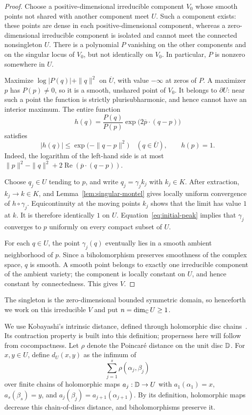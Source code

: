 \begin{proof}
Choose a positive-dimensional irreducible component $V_0$ whose smooth
points not shared with another component meet $U$.  Such a component exists:
these points are dense in each positive-dimensional component, whereas a
zero-dimensional irreducible component is isolated and cannot meet the
connected nonsingleton $U$.  There is a polynomial $P$ vanishing on the
other components and on the singular locus of $V_0$, but not identically on
$V_0$.  In particular, $P$ is nonzero somewhere in $U$.

Maximize $\log|P(q)|+\|q\|^2$ on $\overline U$, with value $-\infty$ at
zeros of $P$.  A maximizer $p$ has $P(p)\ne0$, so it is a smooth, unshared
point of $V_0$.  It belongs to $\partial U$: near such a point the function
is strictly plurisubharmonic, and hence cannot have an interior maximum.
The entire function
\[
  h(q)=\frac{P(q)}{P(p)}
          \exp\bigl(2\overline p\cdot(q-p)\bigr)
\]
satisfies
\begin{equation}\label{eq:initial-peak}
  |h(q)|\leq \exp\bigl(-\|q-p\|^2\bigr)
  \quad(q\in\overline U),\qquad h(p)=1.
\end{equation}
Indeed, the logarithm of the left-hand side is at most
$\|p\|^2-\|q\|^2+2\operatorname{Re}(\overline p\cdot(q-p))$.

Choose $q_j\in U$ tending to $p$, and write $q_j=\gamma_j k_j$ with
$k_j\in K$.  After extraction, $k_j\to k\in K$, and
Lemma~\ref{lem:singular-montel} gives locally uniform convergence of
$h\circ\gamma_j$.  Equicontinuity at the moving points $k_j$ shows that
the limit has value $1$ at $k$.  It is therefore identically $1$ on $U$.
Equation~\eqref{eq:initial-peak} implies that $\gamma_j$ converges to $p$
uniformly on every compact subset of $U$.

For each $q\in U$, the point $\gamma_j(q)$ eventually lies in a smooth
ambient neighborhood of $p$.  Since a biholomorphism preserves smoothness
of the complex space, $q$ is smooth.  A smooth point belongs to exactly one
irreducible component of the ambient variety; the component is locally
constant on $U$, and hence constant by connectedness.  This gives $V$.
\end{proof}

The singleton is the zero-dimensional bounded symmetric domain, so henceforth
we work on this irreducible $V$ and put $n=\dim_\mathbb C U\geq1$.

We use Kobayashi's intrinsic distance, defined through holomorphic disc
chains~\cite[Section~2]{Kobayashi1967}. Its contraction property is built
into this definition; properness here will follow from cocompactness.
Let $\rho$ denote the Poincar\'e distance on the unit disc $\mathbb D$.  For $x,y\in U$,
define $d_U(x,y)$ as the infimum of
\[
                    \sum_{j=1}^s\rho(\alpha_j,\beta_j)
\]
over finite chains of holomorphic maps $a_j:\mathbb D\to U$ with
$a_1(\alpha_1)=x$, $a_s(\beta_s)=y$, and
$a_j(\beta_j)=a_{j+1}(\alpha_{j+1})$.  By its definition, holomorphic maps
decrease this chain-of-discs distance, and biholomorphisms preserve it.

